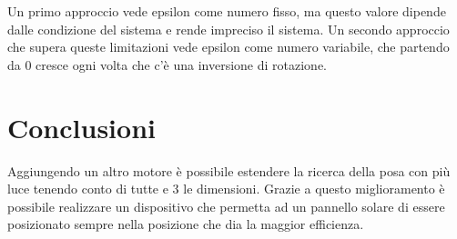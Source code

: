\documentclass[11pt,oneside,a4paper]{article}
\begin{document}
Un primo approccio vede epsilon come numero fisso, ma questo valore dipende dalle condizione del sistema e rende impreciso il sistema. 
Un secondo approccio che supera queste limitazioni vede epsilon come numero variabile, che partendo da 0 cresce ogni volta che c'è una inversione di rotazione.


\section{Conclusioni}
Aggiungendo un altro motore è possibile estendere la ricerca della posa con più luce tenendo conto di tutte e 3 le dimensioni.
Grazie a questo miglioramento è possibile realizzare un dispositivo che permetta ad un pannello solare di essere posizionato sempre nella posizione che dia la maggior efficienza.



\appendix
\end{document}
